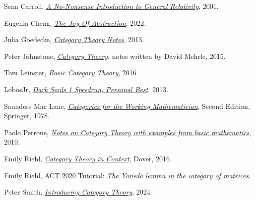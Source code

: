 \begin{thebibliography}{100}
\parskip 0pt
\small
{} Sean Carroll,
\href{https://preposterousuniverse.com/wp-content/uploads/2015/08/grtinypdf.pdf}{\it A
No-Nonsense Introduction to General Relativity},  2001.

 Eugenia Cheng, \href{https://www.cambridge.org/core/books/joy-of-abstraction/00D9AFD3046A406CB85D1AFF5450E657}
{\it The Joy Of Abstraction}, 2022.

 Julia Goedecke,
\href{http://www.julia-goedecke.de/pdf/CategoryTheoryNotes.pdf}{\it Category Theory
Notes}, 2013.

 Peter Johnstone,
\href{http://pi.math.cornell.edu/~dmehrle/notes/partiii/cattheory_partiii_notes.pdf}{\it
Category Theory}, notes written by David Mehrle, 2015.

 Tom Leinster, \href{https://arxiv.org/abs/1612.09375}{\it Basic Category
Theory}, 2016.

 LobosJr, \href{https://www.youtube.com/watch?v=ImMOdTxtf-s}{\it Dark Souls
1 Speedrun, Personal Best}, 2013.

 Saunders Mac Lane,
\href{https://link.springer.com/book/10.1007%2F978-1-4757-4721-8}{\it Categories for the
Working Mathematician}, Second Edition, Springer, 1978.

 Paolo Perrone, \href{https://arxiv.org/abs/1912.10642}{\it Notes on
Category Theory with examples from basic mathematics}, 2019.

 Emily Riehl, \href{https://math.jhu.edu/~eriehl/context/}{\it Category
Theory in Context}, Dover, 2016.

 Emily Riehl, \href{https://www.youtube.com/watch?v=SsgEvrDFJsM}{ACT
2020 Tutorial: {\it The Yoneda lemma in the category of matrices}}.

 Peter Smith,
\href{https://www.logicmatters.net/resources/pdfs/SmithCat.pdf}{\it
Introducing Category Theory}, 2024.

\end{thebibliography}